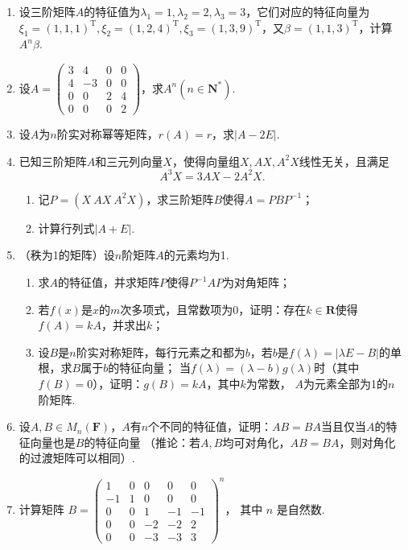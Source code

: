 \begin{enumerate}
	\item 设三阶矩阵$A$的特征值为$\lambda_1=1,\lambda_2=2,\lambda_3=3$，它们对应的特征向量为$\xi_1=(1,1,1)^\mathrm{T},
	\xi_2=(1,2,4)^\mathrm{T},\xi_3=(1,3,9)^\mathrm{T}$，又$\beta=(1,1,3)^\mathrm{T}$，计算$A^n\beta$.
	\item 设$A=\begin{pmatrix}
		3 & 4 & 0 & 0 \\ 4 & -3 & 0 & 0 \\ 0 & 0 & 2 & 4 \\ 0 & 0 & 0 & 2
	\end{pmatrix}$，求$A^n(n\in\mathbf{N^*})$.
	\item 设$A$为$n$阶实对称幂等矩阵，$r(A)=r$，求$|A-2E|$.
	\item 已知三阶矩阵$A$和三元列向量$X$，使得向量组$X,AX,A^2X$线性无关，且满足
	\[A^3X=3AX-2A^2X.\]
    \begin{enumerate}[label=(\arabic*)]
        \item 记$P=(X\ AX\ A^2X)$，求三阶矩阵$B$使得$A=PBP^{-1}$；
        \item 计算行列式$|A+E|$.
    \end{enumerate}
	\item （秩为1的矩阵）设$n$阶矩阵$A$的元素均为1.
	\begin{enumerate}[label=(\arabic*)]
        \item 求$A$的特征值，并求矩阵$P$使得$P^{-1}AP$为对角矩阵；
        \item 若$f(x)$是$x$的$m$次多项式，且常数项为0，证明：存在$k\in\mathbf{R}$使得$f(A)=kA$，并求出$k$；
        \item 设$B$是$n$阶实对称矩阵，每行元素之和都为$b$，若$b$是$f(\lambda)=|\lambda E-B|$的单根，求$B$属于$b$的特征向量；
        当$f(\lambda)=(\lambda-b)g(\lambda)$时（其中$f(B)=0$），证明：$g(B)=kA$，其中$k$为常数，
        $A$为元素全部为1的$n$阶矩阵.
    \end{enumerate}
	\item 设$A,B\in M_n(\mathbf{F})$，$A$有$n$个不同的特征值，证明：$AB=BA$当且仅当$A$的特征向量也是$B$的特征向量
	（推论：若$A,B$均可对角化，$AB=BA$，则对角化的过渡矩阵可以相同）.
    \item 计算矩阵 $B=\begin{pmatrix}1 & 0 & 0 & 0 & 0 \\ -1 & 1 & 0 & 0 & 0 \\ 0 & 0 & 1 & -1 & -1 \\ 0 & 0 & -2 & -2 & 2 \\ 0 & 0 & -3 & -3 & 3\end{pmatrix}^n$，
    其中 $n$ 是自然数.
\end{enumerate}

